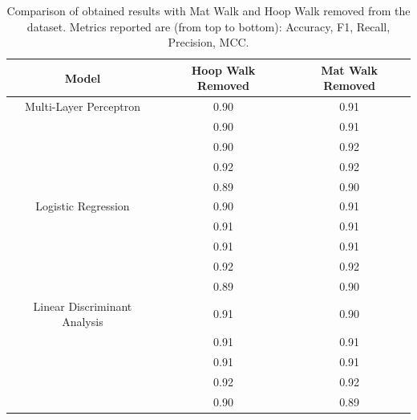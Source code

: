             \begin{table}[htbp]
                \centering
                \begin{tabular}{|c|c|c|}
                \hline
                \textbf{Model} & \textbf{Hoop Walk Removed} & \textbf{Mat Walk Removed} \\ \hline
                    Multi-Layer Perceptron          & 0.90 & 0.91 \\ 
                                                    & 0.90 & 0.91 \\ 
                                                    & 0.90 & 0.92 \\
                                                    & 0.92 & 0.92 \\ 
                                                    & 0.89 & 0.90 \\
                                                    \hline
                    Logistic Regression             & 0.90 & 0.91 \\ 
                                                    & 0.91 & 0.91 \\ 
                                                    & 0.91 & 0.91 \\ 
                                                    & 0.92 & 0.92 \\
                                                    & 0.89 & 0.90 \\
                                                    \hline
                    Linear Discriminant Analysis    & 0.91 & 0.90 \\ 
                                                    & 0.91 & 0.91 \\ 
                                                    & 0.91 & 0.91 \\ 
                                                    & 0.92 & 0.92 \\
                                                    & 0.90 & 0.89 \\ 
                                                    \hline
                \end{tabular}
                \caption{Comparison of obtained results with Mat Walk and Hoop Walk removed from the dataset. Metrics reported are (from top to bottom): Accuracy, F1, Recall, Precision, MCC.}
                \label{tab:feature_engineering_approach_mat_hoop}
            \end{table}
\newpage
            
